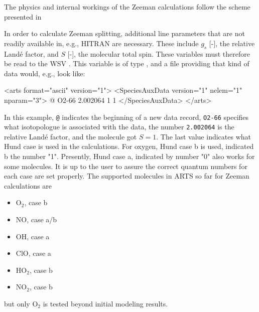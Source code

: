 The physics and internal workings of the Zeeman calculations follow the scheme
presented in \citet{larsson:xx} %

In order to calculate Zeeman splitting, additional line parameters that are not
readily available in, e.g., HITRAN are necessary. These include $g_s$ [-], the
relative Land\'{e} factor, and $S$ [-], the molecular total spin. These
variables must therefore be read to the WSV .
This variable is of type , and a file providing
that kind of data would, e.g., look like:
\begin{code}
<arts format="ascii" version="1">
  <SpeciesAuxData version="1" nelem="1" nparam="3">
    @ O2-66 2.002064 1 1
  </SpeciesAuxData>
</arts>
\end{code}
In this example, \verb|@| indicates the beginning of a new data record, \verb|O2-66|
specifies what isotopologue is associated with the data, the number
\verb|2.002064| is the relative Land\'{e} factor, and the molecule got $S=1$.
The last value indicates what Hund case is used in the calculations. For oxygen,
Hund case b is used, indicated b the number "1". Presently, Hund case a, indicated
by number "0" also works for some molecules. It is up to the user to assure the
correct quantum numbers for each case are set properly.
The supported molecules in ARTS so far for Zeeman calculations are
\begin{itemize}
\item O$_2$, case b
\item NO, case a/b
\item OH, case a
\item ClO, case a
\item HO$_2$, case b
\item NO$_2$, case b
\end{itemize}
but only O$_2$ is tested beyond initial modeling results.

